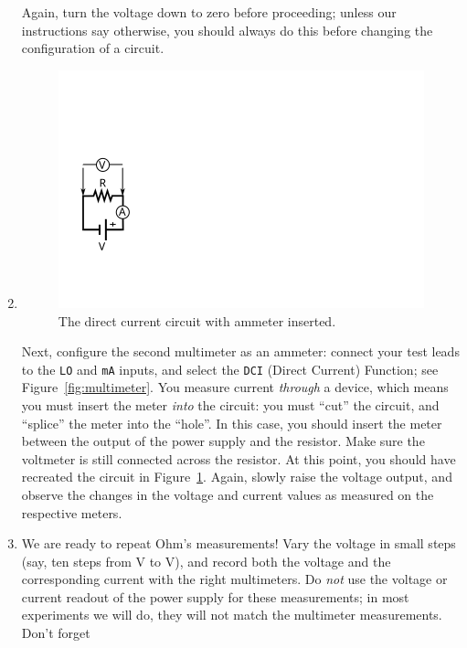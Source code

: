 \documentclass[12pt]{article}
\begin{document}
\begin{enumerate}
  Again, turn the voltage down to zero before proceeding; unless our
  instructions say otherwise, you should always do this before
  changing the configuration of a circuit.
\item 
  \begin{figure}
    \centering
    \includegraphics[width=\textwidth/5]{figures/simplest_with_ammeter}
    \caption{The direct current circuit with ammeter inserted.}
    \label{fig:simplest_with_ammeter}
  \end{figure}
  Next, configure the second multimeter as an ammeter: connect your
  test leads to the \texttt{LO} and \texttt{mA} inputs, and select the
  \texttt{DCI} (Direct Current) Function; see
  Figure~\ref{fig:multimeter}.  You measure current \textit{through} a
  device, which means you must insert the meter \textit{into} the
  circuit: you must ``cut'' the circuit, and ``splice'' the meter into
  the ``hole''.  In this case, you should insert the meter between the
  output of the power supply and the resistor.  Make sure the
  voltmeter is still connected across the resistor.  At this point,
  you should have recreated the circuit in
  Figure~\ref{fig:simplest_with_ammeter}.  Again, slowly raise the
  voltage output, and observe the changes in the voltage and current
  values as measured on the respective meters.
\item We are ready to repeat Ohm's measurements!  Vary the voltage in
  small steps (say, ten steps from \unit[0]{V} to \unit[10]{V}), and
  record both the voltage and the corresponding current with the right
  multimeters.  Do \textit{not} use the voltage or current readout of
  the power supply for these measurements; in most experiments we will
  do, they will not match the multimeter measurements.  Don't forget

\end{enumerate}
\end{document}
